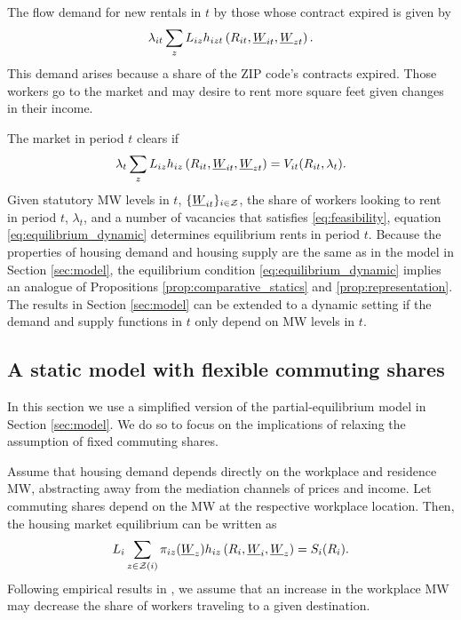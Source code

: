The flow demand for new rentals in $t$ by those whose contract expired is given 
by
$$
\lambda_{it} \sum_z L_{iz} h_{izt} \left(R_{it}, \underline{W}_{it}, \underline{W}_{zt} \right) .
$$
This demand arises because a share of the ZIP code's contracts expired. 
Those workers go to the market and may desire to rent more square feet given 
changes in their income.

The market in period $t$ clears if
\begin{equation}\label{eq:equilibrium_dynamic}
    \lambda_t \sum_z L_{iz} h_{iz} \left(R_{it}, \underline{W}_{it}, \underline{W}_{zt} \right) = 
    V_{it}(R_{it}, \lambda_t) .
\end{equation}
Given statutory MW levels in $t$, $\{\underline{W}_{it}\}_{i\in\mathcal{Z}}$,
the share of workers looking to rent in period $t$, $\lambda_t$, and 
a number of vacancies that satisfies \eqref{eq:feasibility}, 
equation \eqref{eq:equilibrium_dynamic} determines equilibrium rents in 
period $t$.
Because the properties of housing demand and housing supply are the same as in 
the model in Section \ref{sec:model},
the equilibrium condition \eqref{eq:equilibrium_dynamic} implies an analogue of 
Propositions \ref{prop:comparative_statics} and \ref{prop:representation}.
The results in Section \ref{sec:model} can be extended to a dynamic setting if
the demand and supply functions in $t$ only depend on MW levels in $t$.

\subsection{A static model with flexible commuting shares}\label{sec:model_endogenous_shares}

In this section we use a simplified version of the partial-equilibrium model 
in Section \ref{sec:model}.
We do so to focus on the implications of relaxing the assumption of fixed 
commuting shares.

Assume that housing demand depends directly on the workplace and residence MW,
abstracting away from the mediation channels of prices and income.
Let commuting shares depend on the MW at the respective workplace location.
Then, the housing market equilibrium can be written as
\begin{equation}\label{eq:equilibrium_simplified}
	L_i \sum_{z\in\mathcal{Z}(i)} \pi_{iz} (\underline{W}_z) h_{iz} \left(R_i, \underline{W}_i, \underline{W}_z\right) = S_i(R_i) .
\end{equation}
Following empirical results in \textcite{PerezPerez2021}, we assume that 
an increase in the workplace MW may decrease the share of workers traveling to 
a given destination.

